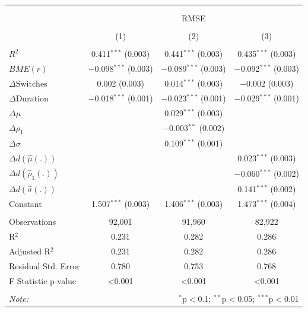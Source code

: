 \begin{tabular}{@{\extracolsep{5pt}}lccc} 
\\[-1.8ex]\hline 
\hline \\[-1.8ex] 
\\[-1.8ex] & \multicolumn{3}{c}{RMSE} \\ 
\\[-1.8ex] & (1) & (2) & (3)\\ 
\hline \\[-1.8ex] 
 $R^2$ & 0.411$^{***}$ (0.003) & 0.441$^{***}$ (0.003) & 0.435$^{***}$ (0.003) \\ 
  $BME(r)$ & $-$0.098$^{***}$ (0.003) & $-$0.089$^{***}$ (0.003) & $-$0.092$^{***}$ (0.003) \\ 
  $\Delta \text{Switches}$ & 0.002 (0.003) & 0.014$^{***}$ (0.003) & $-$0.002 (0.003) \\ 
  $\Delta \text{Duration}$ & $-$0.018$^{***}$ (0.001) & $-$0.023$^{***}$ (0.001) & $-$0.029$^{***}$ (0.001) \\ 
  $\Delta \mu$ &  & 0.029$^{***}$ (0.003) &  \\ 
  $\Delta \rho_1$ &  & $-$0.003$^{**}$ (0.002) &  \\ 
  $\Delta \sigma$ &  & 0.109$^{***}$ (0.001) &  \\ 
  $\Delta d(\hat{\mu}(.))$ &  &  & 0.023$^{***}$ (0.003) \\ 
  $\Delta d(\hat{\rho}_1(.))$ &  &  & $-$0.060$^{***}$ (0.002) \\ 
  $\Delta d(\hat{\sigma}(.))$ &  &  & 0.141$^{***}$ (0.002) \\ 
  Constant & 1.507$^{***}$ (0.003) & 1.406$^{***}$ (0.003) & 1.473$^{***}$ (0.004) \\ 
 \hline \\[-1.8ex] 
Observations & 92,001 & 91,960 & 82,922 \\ 
R$^{2}$ & 0.231 & 0.282 & 0.286 \\ 
Adjusted R$^{2}$ & 0.231 & 0.282 & 0.286 \\ 
Residual Std. Error & 0.780 & 0.753 & 0.768 \\ 
F Statistic p-value & <0.001 & <0.001 & <0.001 \\ 
\hline 
\hline \\[-1.8ex] 
\textit{Note:}  & \multicolumn{3}{r}{$^{*}$p$<$0.1; $^{**}$p$<$0.05; $^{***}$p$<$0.01} \\ 
\end{tabular} 
